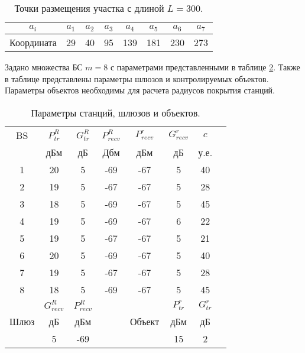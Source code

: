 \begin{table}[h!]\centering
  \begin{tabular}{|c||c|c|c|c|c|c|c|}\hline
    $a_i$ & $a_1$ &  $a_2$ & $a_3$ & $a_4$ & $a_5$ & $a_6$ & $a_7$ \\ \hline \hline
    Координата & 29 & 40 & 95 & 139 & 181 & 230 & 273 \\ \hline
\end{tabular}\caption{Точки размещения участка с длиной $L = 300$.}\label{tab:part3_placed_point}
\end{table}

Задано множества БС $m = 8$ с параметрами представленными в таблице \cref{tab:part3_BS}. Также в таблице представлены параметры шлюзов и контролируемых объектов. Параметры объектов необходимы для расчета радиусов покрытия станций.

\begin{table}[b]\centering
  \begin{tabular}{|c||c|c|c|c|c|c|c|}\hline
    BS & $P_{tr}^R$ &  $G_{tr}^R$ & $P_{recv}^R$ & $P_{recv}^r$ & $G_{recv}^r$ & $c$ \\ \cline{2-1} \cline{3-1} \cline{4-1} \cline{5-1}  \cline{6-1} \cline{7-1}
     & дБм & дБ & Дбм & дБм & дБ & у.е.  \\ \hline
    1 & 20 & 5 & -69 & -67 & 5 & 40 \\ 

    2 & 19 & 5 & -67 & -67 & 5 & 28 \\ 

    3 & 18 & 5 & -69 & -67 & 5 & 45 \\ 

    4 & 19 & 5 & -69 & -67 & 6 & 22 \\ 

    5 & 19 & 5 & -67 & -67 & 5 & 21 \\ 

    6 & 20 & 5 & -69 & -67 & 5 & 40 \\ 

    7 & 19 & 5 & -67 & -67 & 5 & 28 \\

    8 & 18 & 5 & -69 & -67 & 5 & 45 \\ \hline \hline  

    &  $G_{recv}^R$ & $P_{recv}^R$ &  & & $P_{tr}^r$ & $G_{tr}^r$ \\  \cline{2-1} \cline{3-1} \cline{6-1} \cline{7-1} 

    Шлюз& дБ & дБм & & Объект & дБм & дБ  \\  \cline{2-1} \cline{3-1}  \cline{6-1} \cline{7-1}

    &  5 & -69 & &  & 15 & 2  \\ \hline

  \end{tabular}\caption{Параметры станций, шлюзов и объектов.}\label{tab:part3_BS} 
\end{table}


